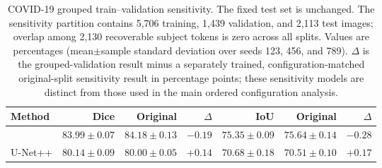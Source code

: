 \begin{table}[htbp]
\centering
\caption{COVID-19 grouped train--validation sensitivity. The fixed test set is
unchanged. The sensitivity partition contains 5,706 training, 1,439 validation,
and 2,113 test images; overlap among 2,130 recoverable subject tokens is zero
across all splits. Values are percentages (mean$\pm$sample standard deviation
over seeds 123, 456, and 789). $\Delta$ is the grouped-validation result minus
a separately trained, configuration-matched original-split sensitivity result
in percentage points; these sensitivity models are distinct from those used in
the main ordered configuration analysis.}
\label{tab:covid_groupval}
\scriptsize
\setlength{\tabcolsep}{3.2pt}
\begin{tabular}{@{}lrrrrrr@{}}
\toprule
Method & Dice & Original & $\Delta$ & IoU & Original & $\Delta$ \\
\midrule
\methodname{} & $83.99\pm0.07$ & $84.18\pm0.13$ & $-0.19$ & $75.35\pm0.09$ & $75.64\pm0.14$ & $-0.28$ \\
U-Net++ & $80.14\pm0.09$ & $80.00\pm0.05$ & $+0.14$ & $70.68\pm0.18$ & $70.51\pm0.10$ & $+0.17$ \\
\bottomrule
\end{tabular}
\end{table}
